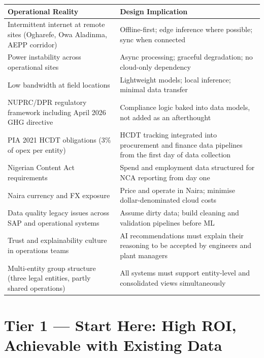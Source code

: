 \documentclass[10pt]{article}
\begin{document}
\vspace{4pt}
\small
\begin{tabularx}{\columnwidth}{@{}lX@{}}
\toprule
\textbf{Operational Reality} & \textbf{Design Implication} \\
\midrule
Intermittent internet at remote sites (Ogharefe, Owa Aladinma, AEPP corridor)
  & Offline-first; edge inference where possible; sync when connected \\[3pt]
Power instability across operational sites
  & Async processing; graceful degradation; no cloud-only dependency \\[3pt]
Low bandwidth at field locations
  & Lightweight models; local inference; minimal data transfer \\[3pt]
NUPRC/DPR regulatory framework including April 2026 GHG directive
  & Compliance logic baked into data models, not added as an afterthought \\[3pt]
PIA 2021 HCDT obligations (3\% of opex per entity)
  & HCDT tracking integrated into procurement and finance data pipelines
    from the first day of data collection \\[3pt]
Nigerian Content Act requirements
  & Spend and employment data structured for NCA reporting from day one \\[3pt]
Naira currency and FX exposure
  & Price and operate in Naira; minimise dollar-denominated cloud costs \\[3pt]
Data quality legacy issues across SAP and operational systems
  & Assume dirty data; build cleaning and validation pipelines before ML \\[3pt]
Trust and explainability culture in operations teams
  & AI recommendations must explain their reasoning to be accepted by
    engineers and plant managers \\[3pt]
Multi-entity group structure (three legal entities, partly shared operations)
  & All systems must support entity-level and consolidated views simultaneously \\
\bottomrule
\end{tabularx}
\normalsize

\vspace{10pt}

\section{Tier 1 --- Start Here: High ROI, Achievable with Existing Data}
\end{document}
